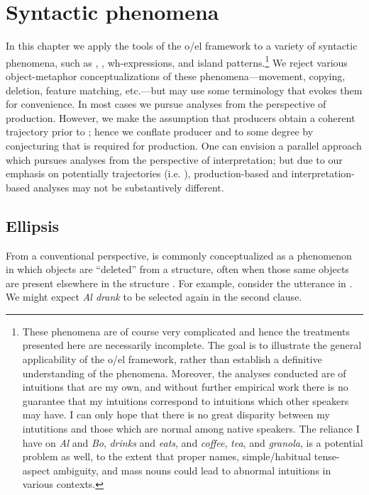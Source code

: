 \chapter{Syntactic phenomena}

In this chapter we apply the tools of the o/el framework to a variety of syntactic phenomena, such as , , wh-expressions, and island patterns.\footnote{These phenomena are of course very complicated and hence the treatments presented here are necessarily incomplete. The goal is to illustrate the general applicability of the o/el framework, rather than establish a definitive understanding of the phenomena. Moreover, the analyses conducted are of  intuitions that are my own, and without further empirical work there is no guarantee that my intuitions correspond to intuitions which other speakers may have. I can only hope that there is no great disparity between my intutitions and those which are normal among native speakers. The reliance I have on \textit{Al} and \textit{Bo}, \textit{drinks} and \textit{eats}, and \textit{coffee}, \textit{tea}, and \textit{granola}, is a potential problem as well, to the extent that proper names, simple/habitual tense-aspect ambiguity, and mass nouns could lead to abnormal  intuitions in various contexts.} We reject various object-metaphor conceptualizations of these phenomena—movement, copying, deletion, feature matching, etc.—but may use some terminology that evokes them for convenience. In most cases we pursue analyses from the perspective of production. However, we make the assumption that producers obtain a coherent trajectory prior to ; hence we conflate producer and  to some degree by conjecturing that  is required for production. One can envision a parallel approach which pursues analyses from the perspective of interpretation; but due to our emphasis on potentially  trajectories (i.e. ), production-based and interpretation-based analyses may not be substantively different. 

\section{Ellipsis}

From a conventional perspective,  is commonly conceptualized as a phenomenon in which objects are “deleted” from a structure, often when those same objects are present elsewhere in the structure \citep{Merchant2001,Merchant2005,Merchant2013}. For example, consider the utterance in . We might expect \textit{Al drank} to be selected again in the second clause.

